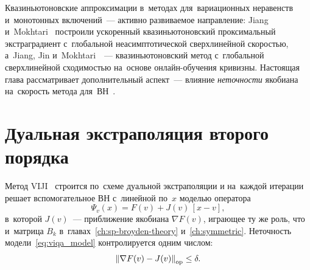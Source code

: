 Квазиньютоновские аппроксимации в~методах для~вариационных неравенств
и~монотонных включений~--- активно развиваемое направление: Jiang
и~Mokhtari~\cite{jiang2023accel} построили ускоренный квазиньютоновский
проксимальный экстраградиент с~глобальной неасимптотической
сверхлинейной скоростью, а~Jiang, Jin и~Mokhtari~\cite{jiang2023online}~---
квазиньютоновский метод с~глобальной сверхлинейной сходимостью на~основе
онлайн-обучения кривизны. Настоящая глава рассматривает дополнительный
аспект~--- влияние \emph{неточности} якобиана на~скорость метода
для~ВН~\cite{viqa2024}.

\section{Дуальная экстраполяция второго порядка}\label{sec:viqa_method}

Метод VIJI~\cite{viqa2024} строится по~схеме дуальной экстраполяции и
на~каждой итерации решает вспомогательное ВН с~линейной по~$x$ моделью
оператора
\begin{equation}\label{eq:viqa_model}
  \Psi_v(x) = F(v) + J(v)\,[x-v],
\end{equation}
в~которой $J(v)$~--- приближение якобиана $\nabla F(v)$, играющее ту же
роль, что и~матрица $B_k$ в~главах~\ref{ch:sp-broyden-theory}
и~\ref{ch:symmetric}. Неточность модели~\eqref{eq:viqa_model}
контролируется одним числом:
\begin{equation}\label{eq:viqa_delta}
  \left\|\nabla F(v) - J(v)\right\|_{\mathrm{op}} \le \delta .
\end{equation}

